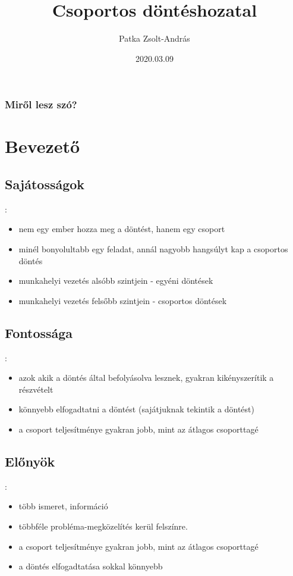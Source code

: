 \documentclass{beamer}
\title{Csoportos döntéshozatal}
\author{Patka Zsolt-András}
\institute{Sapientia EMTE}
\date{2020.03.09}
\begin{document}
\begin{frame}
    \titlepage
\end{frame}

\begin{frame}
\frametitle{Miről lesz szó?}
\tableofcontents
\end{frame}


\section{Bevezető}

\subsection{Sajátosságok}
\begin{frame}{\secname : \subsecname}
    \begin{itemize}
        \item nem egy ember hozza meg a döntést, hanem egy csoport
        \item minél bonyolultabb egy feladat, annál nagyobb hangsúlyt kap a csoportos döntés
        \item munkahelyi vezetés alsóbb szintjein - egyéni döntések
        \item munkahelyi vezetés felsőbb szintjein - csoportos döntések
    \end{itemize}
\end{frame}

\subsection{Fontossága}
\begin{frame}{\secname : \subsecname}
    \begin{itemize}
        \item azok akik a döntés által befolyásolva lesznek, gyakran kikényszerítik a részvételt
        \item könnyebb elfogadtatni a döntést (sajátjuknak tekintik a döntést)
        \item a csoport teljesítménye gyakran jobb, mint az átlagos csoporttagé
    \end{itemize}
\end{frame}


\subsection{Előnyök}
\begin{frame}{\secname : \subsecname}
    \begin{itemize}
        \item több ismeret, információ
        \item többféle probléma-megközelítés kerül felszínre.
        \item a csoport teljesítménye gyakran jobb, mint az átlagos csoporttagé
        \item a döntés elfogadtatása sokkal könnyebb
    \end{itemize}
\end{frame}
\end{document}
